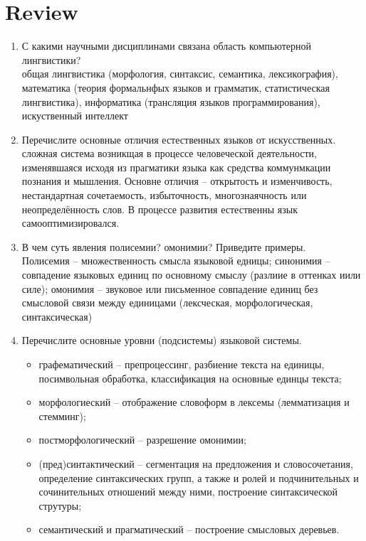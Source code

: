 \documentclass[a4paper]{article}
\begin{document}

\section{Review} %
\label{sec:review}
\begin{enumerate}
	\item С какими научными дисциплинами связана область компьютерной лингвистики?\hfill\\
	общая лингвистика (морфология, синтаксис, семантика, лексикография), математика (теория формальнфых языков и грамматик, статистическая лингвистика), информатика (трансляция языков программирования), искуственный интеллект

	\item Перечислите основные отличия естественных языков от искусственных.\hfill\\
	сложная система возникщая в процессе человеческой деятельности, изменявшаяся исходя из прагматики языка как средства коммунмкации познания и мышления. Основне отличия -- открытость и изменчивость, нестандартная сочетаемость, избыточность, многознаячность или неопределённость слов. В процессе развития естественны язык самооптимизировался.

	\item В чем суть явления полисемии? омонимии? Приведите примеры.\hfill\\
	Полисемия -- множественность смысла языковой едницы; синонимия -- совпадение языковых единиц по основному смыслу (разлиие в оттенках иили силе); омонимия -- звуковое или письменное совпадение единиц без смысловой связи между единицами (лексческая, морфологическая, синтаксическая)

	\item Перечислите основные уровни (подсистемы) языковой системы.\hfill\\ \begin{itemize}
		\item графематический -- препроцессинг, разбиение текста на единицы, посимвольная обработка, классификация на основные единцы текста;
		\item морфологиеский -- отображение словоформ в лексемы (лемматизация и стемминг);
		\item постморфологический -- разрешение омонимии;
		\item (пред)синтактический -- сегментация на предложения и словосочетания, определение синтаксических групп, а также и ролей и подчинительных и сочинительных отношений между ними, построение синтаксической струтуры;
		\item семантический и прагматический -- построение смысловых деревьев. 
	\end{itemize}


\end{enumerate}
\end{document}
